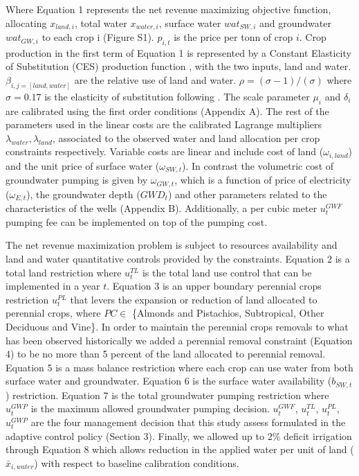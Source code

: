 \documentclass[a4paper,fleqn]{cas-sc}
\begin{document}
Where Equation 1 represents the net revenue maximizing objective function, allocating $x_{land,i}$, total water $x_{water,i}$, surface water $wat_{SW,i}$ and groundwater $wat_{GW,i}$ to each crop i (Figure S1). $p_{i,t}$ is the price per tonn of crop $i$. Crop production in the first term of Equation 1 is represented by a Constant Elasticity of Substitution (CES) production function \citep{debertin_agricultural_2012}, with the two inputs, land and water.  $\beta_{i,j=[land,water]}$ are the relative use of land and water. $\rho = (\sigma-1)/(\sigma)$ where $\sigma = 0.17$ is the elasticity of substitution following \citet{howitt_calibrating_2012}. The scale parameter $\mu_{i}$ and $\delta_{i}$ are calibrated using the first order conditions (Appendix A). The rest of the parameters used in the linear costs are the calibrated Lagrange multipliers $\lambda_{water},\lambda_{land}$, associated to the observed water and land allocation per crop constraints respectively. Variable costs are linear and include cost of land ($\omega_{i,land}$) and the unit price of surface water ($\omega_{SW,t}$). In contrast the volumetric cost of groundwater pumping is given by $\omega_{GW,t}$, which is a function of price of electricity ($\omega_{E,t}$), the groundwater depth ($GWD_t$) and other parameters related to the characteristics of the wells (Appendix B). Additionally, a per cubic meter $u^{GWF}_{t}$ pumping fee can be implemented on top of the pumping cost.

The net revenue maximization problem is subject to resources availability and land and water quantitative controls provided by the constraints. Equation 2 is a total land restriction where $u^{TL}_{t}$ is the total land use control that can be implemented in a year $t$. Equation 3 is an upper boundary perennial crops restriction $u^{PL}_{t}$ that levers the expansion or reduction of land allocated to perennial crops, where $PC \in$ \{Almonds and Pistachios, Subtropical, Other Deciduous and Vine\}. In order to maintain the perennial crops removals to what has been observed historically we added a perennial removal constraint (Equation 4) to be no more than 5 percent of the land allocated to perennial removal. Equation 5 is a mass balance restriction where each crop can use water from both surface water and groundwater. Equation 6 is the surface water availability ($b_{SW,t}$) restriction. Equation 7 is the total groundwater pumping restriction where $u^{GWP}_{t}$ is the maximum allowed groundwater pumping decision. $u^{GWF}_{t}$, $u^{TL}_{t}$, $u^{PL}_{t}$, $u^{GWP}_{t}$ are the four management decision that this study assess formulated in the adaptive control policy (Section  3).  Finally, we allowed up to 2\% deficit irrigation through Equation 8 which allows reduction in the applied water per  unit of land ($\bar{x}_{i,water}$) with respect to baseline calibration conditions. 
\end{document}
